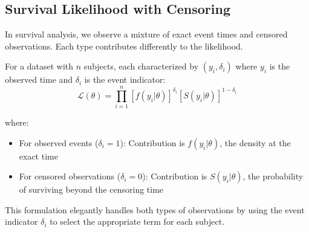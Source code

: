\subsection{Survival Likelihood with Censoring}

In survival analysis, we observe a mixture of exact event times and censored observations. Each type contributes differently to the likelihood.

\begin{equationbox}[title=Survival Likelihood with Right Censoring]
For a dataset with $n$ subjects, each characterized by $(y_i, \delta_i)$ where $y_i$ is the observed time and $\delta_i$ is the event indicator:
\begin{equation}
    \mathcal{L}(\theta) = \prod_{i=1}^{n} [f(y_i|\theta)]^{\delta_i} [S(y_i|\theta)]^{1-\delta_i}
\end{equation}

where:
\begin{itemize}
    \item For observed events ($\delta_i = 1$): Contribution is $f(y_i|\theta)$, the density at the exact time
    \item For censored observations ($\delta_i = 0$): Contribution is $S(y_i|\theta)$, the probability of surviving beyond the censoring time
\end{itemize}
\end{equationbox}

This formulation elegantly handles both types of observations by using the event indicator $\delta_i$ to select the appropriate term for each subject.

